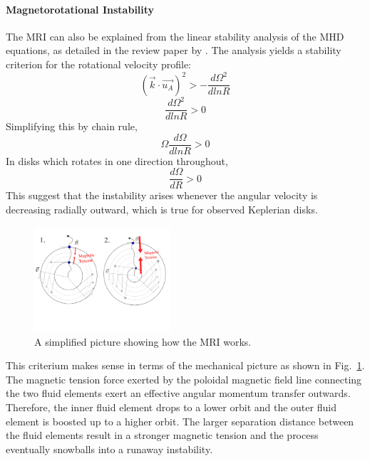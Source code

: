 \documentclass[iop,revtex4]{emulateapj}
\begin{document}
\paragraph*{\rm{\textbf{Magnetorotational Instability}\\}}
The \ac{MRI} can also be explained from the linear stability analysis of the \ac{MHD} equations, as detailed in the review paper by \cite{Balbus:1998A}. The analysis yields a stability criterion for the rotational velocity profile: 
\begin{equation}
(\vec{k}\cdot\vec{u_A})^2> -\frac{d\Omega^2}{d ln R}
\end{equation}
\begin{equation}
\frac{d\Omega^2}{d ln R}>0
\end{equation}
 Simplifying this by chain rule, 
\begin{equation}
\Omega \frac{d\Omega}{d ln R}>0
\end{equation}
In disks which rotates in one direction throughout, 
\begin{equation}
 \frac{d\Omega}{d R}>0
\end{equation}
This suggest that the instability arises whenever the angular velocity is decreasing radially outward, which is true for observed Keplerian disks.
\begin{figure}[ht]
\includegraphics[width=0.45\textwidth,trim=0 100  0 50,bb=0 0 30 30]{plots/mri_cartoon.pdf}
\caption{A simplified picture showing how the \ac{MRI} works.}
\label{mri_cartoon}
\end{figure}
\par This criterium makes sense in terms of the mechanical picture as shown in Fig.~\ref{mri_cartoon}. The magnetic tension force exerted by the poloidal magnetic field line connecting the two fluid elements exert an effective angular momentum transfer outwards. Therefore, the inner fluid element drops to a lower orbit and the  outer fluid element is boosted up to a higher orbit. The larger separation distance between the fluid elements result in a stronger magnetic tension and the process eventually snowballs into a runaway instability.
\end{document}
